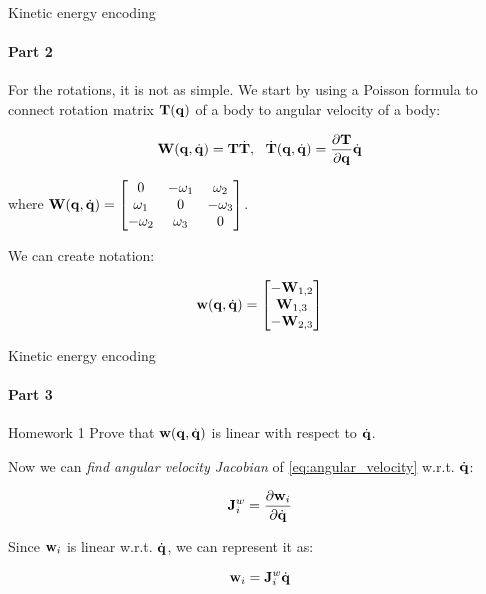 \documentclass{beamer}
\begin{document}
\begin{frame}{Kinetic energy encoding}
\framesubtitle{Part 2}
\begin{flushleft}

For the rotations, it is not as simple. We start by using a Poisson formula to connect rotation matrix $\mathbf{T}(\mathbf{q})$ of a body to angular velocity of a body:

\begin{equation}
\mathbf{W}(\mathbf{q}, \dot{\mathbf{q}}) = \mathbf{T} \dot{\mathbf{T}}, \ \ \dot{\mathbf{T}}(\mathbf{q}, \dot{\mathbf{q}}) = \frac{\partial \mathbf{T}}{\partial {\mathbf{q}}} \dot{\mathbf{q}}
\end{equation}

where $\mathbf{W}(\mathbf{q}, \dot{\mathbf{q}}) = 
\begin{bmatrix}  0         & -\omega_1 &  \omega_2  \\
                 \omega_1  & 0         & -\omega_3 \\
                -\omega_2  & \omega_3  &  0
\end{bmatrix}$.

We can create notation:

\begin{equation}
\label{eq:angular_velocity}
\mathbf{w}(\mathbf{q}, \dot{\mathbf{q}}) = 
\begin{bmatrix}  
    -\mathbf{W}_{1, 2} \\ 
     \mathbf{W}_{1, 3} \\ 
    -\mathbf{W}_{2, 3}
\end{bmatrix}
\end{equation}

\end{flushleft}
\end{frame}





\begin{frame}{Kinetic energy encoding}
\framesubtitle{Part 3}
\begin{flushleft}


\begin{block}{Homework 1}
Prove that $\mathbf{w}(\mathbf{q}, \dot{\mathbf{q}})$ is linear with respect to $\dot{\mathbf{q}}$.
\end{block}

Now we can \emph{find angular velocity Jacobian} of \eqref{eq:angular_velocity} w.r.t. $\dot{\mathbf{q}}$:

\begin{equation}
\label{eq:angular_velocity_jacobian}
\mathbf{J}^w_i = \frac{\partial \mathbf{w}_i }{\partial \dot{\mathbf{q}}}
\end{equation}

Since $\mathbf{w}_i$ is linear w.r.t. $\dot{\mathbf{q}}$, we can represent it as:

\begin{equation}
\mathbf{w}_i  = \mathbf{J}^w_i \dot{\mathbf{q}}
\end{equation}


\end{flushleft}
\end{frame}
\end{document}
